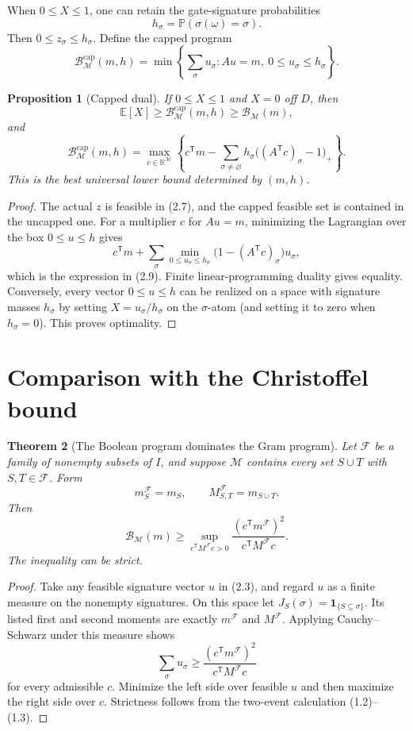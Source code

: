 \documentclass[11pt]{article}
\newtheorem{theorem}{Theorem}[section]
\newtheorem{proposition}[theorem]{Proposition}
\theoremstyle{definition}
\theoremstyle{remark}
\newcommand{\E}{\mathbb E}
\newcommand{\Pp}{\mathbb P}
\newcommand{\one}{\mathbf 1}
\newcommand{\cM}{\mathcal M}
\newcommand{\cB}{\mathcal B}
\begin{document}
When $0\leq X\leq1$, one can retain the gate-signature probabilities
\[
 h_\sigma=\Pp(\sigma(\omega)=\sigma).
\]
Then $0\leq z_\sigma\leq h_\sigma$.  Define the capped program
\[
 \cB^{\mathrm{cap}}_{\cM}(m,h)=
 \min\left\{
  \sum_\sigma u_\sigma:Au=m,\ 0\leq u_\sigma\leq h_\sigma
 \right\}.
 \tag{2.7}
\]

\begin{proposition}[Capped dual]\label{prop:capped}
If $0\leq X\leq1$ and $X=0$ off $D$, then
\[
 \E[X]\geq\cB^{\mathrm{cap}}_{\cM}(m,h)
 \geq\cB_{\cM}(m),
 \tag{2.8}
\]
and
\[
 \boxed{
 \cB^{\mathrm{cap}}_{\cM}(m,h)
 =\max_{c\in\mathbb R^{\cM}}
 \left\{
 c^{\mathsf T}m-
 \sum_{\sigma\ne\varnothing}h_\sigma
 \bigl((A^{\mathsf T}c)_\sigma-1\bigr)_+
 \right\}.}
 \tag{2.9}
\]
This is the best universal lower bound determined by $(m,h)$.
\end{proposition}

\begin{proof}
The actual $z$ is feasible in (2.7), and the capped feasible set is
contained in the uncapped one.  For a multiplier $c$ for $Au=m$, minimizing
the Lagrangian over the box $0\leq u\leq h$ gives
\[
 c^{\mathsf T}m+
 \sum_\sigma\min_{0\leq u_\sigma\leq h_\sigma}
 \bigl(1-(A^{\mathsf T}c)_\sigma\bigr)u_\sigma,
\]
which is the expression in (2.9).  Finite linear-programming duality gives
equality.  Conversely, every vector $0\leq u\leq h$ can be realized on a
space with signature masses $h_\sigma$ by setting
$X=u_\sigma/h_\sigma$ on the $\sigma$-atom (and setting it to zero when
$h_\sigma=0$).  This proves optimality.
\end{proof}

\section{Comparison with the Christoffel bound}

\begin{theorem}[The Boolean program dominates the Gram program]
Let $\mathcal F$ be a family of nonempty subsets of $I$, and suppose
$\cM$ contains every set $S\cup T$ with $S,T\in\mathcal F$.  Form
\[
 m^{\mathcal F}_S=m_S,
 \qquad M^{\mathcal F}_{S,T}=m_{S\cup T}.
\]
Then
\[
 \boxed{
 \cB_{\cM}(m)\geq
 \sup_{c^{\mathsf T}M^{\mathcal F}c>0}
 \frac{(c^{\mathsf T}m^{\mathcal F})^2}
      {c^{\mathsf T}M^{\mathcal F}c}.}
 \tag{3.1}
\]
The inequality can be strict.
\end{theorem}

\begin{proof}
Take any feasible signature vector $u$ in (2.3), and regard $u$ as a
finite measure on the nonempty signatures.  On this space let
$J_S(\sigma)=\one_{\{S\subseteq\sigma\}}$.  Its listed first and second
moments are exactly $m^{\mathcal F}$ and $M^{\mathcal F}$.  Applying
Cauchy--Schwarz under this measure shows
\[
 \sum_\sigma u_\sigma\geq
 \frac{(c^{\mathsf T}m^{\mathcal F})^2}
      {c^{\mathsf T}M^{\mathcal F}c}
\]
for every admissible $c$.  Minimize the left side over feasible $u$ and
then maximize the right side over $c$.  Strictness follows from the
two-event calculation (1.2)--(1.3).
\end{proof}
\end{document}
